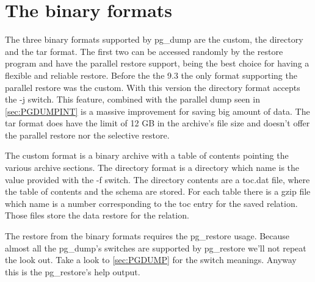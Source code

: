 \section{The binary formats}
\label{sec:PGDUMPBINFMT}
The three binary formats supported by pg\_dump are the custom, the directory and the tar format. 
The first two can be accessed randomly by the restore program and have the parallel restore 
support, being the best choice for having a flexible and reliable restore. Before the the 9.3 the 
only format supporting the parallel restore was the custom. With this version the directory 
format accepts the -j switch. This feature, combined with the parallel dump seen in 
\ref{sec:PGDUMPINT} is a massive improvement for saving big amount of data. The tar format does 
have the limit of 12 GB in the archive's file size and doesn't offer the parallel restore nor the 
selective restore. \newline

The custom format is a binary archive with a table of contents pointing the various archive 
sections. The directory format is a directory which name is the value provided with the -f switch. 
The directory contents are a toc.dat file, where the table of contents and the schema are stored. 
For each table there is a gzip file which name is a number corresponding to the toc entry for the 
saved relation. Those files store the data restore for the relation.\newline


The restore from the binary formats requires the pg\_restore usage. Because almost 
all the pg\_dump's switches are supported by pg\_restore we'll not repeat the look out. Take a look 
to  \ref{sec:PGDUMP} for the switch meanings. Anyway this is the pg\_restore's help output.
\newline 

